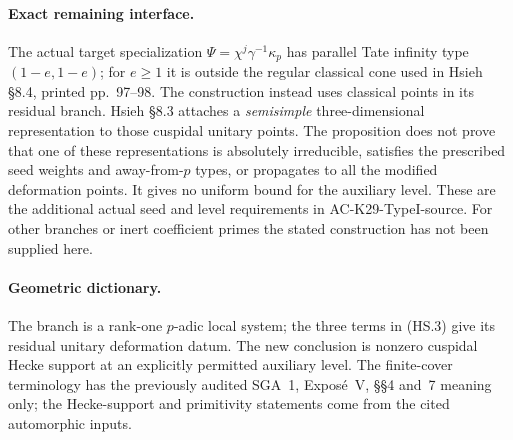 \paragraph{Exact remaining interface.}
The actual target specialization
$\Psi=\chi^j\gamma^{-1}\kappa_p$ has parallel Tate
infinity type $(1-e,1-e)$; for $e\ge1$ it is outside
the regular classical cone used in Hsieh \S8.4,
printed pp.~97--98.  The construction instead uses
classical points in its residual branch.
Hsieh \S8.3 attaches a \emph{semisimple}
three-dimensional representation to those cuspidal
unitary points.  The proposition does not prove
that one of these representations is absolutely
irreducible, satisfies the prescribed seed weights
and away-from-$p$ types, or propagates to all the
modified deformation points.
It gives no uniform bound for the auxiliary level.
These are the additional actual seed and level
requirements in AC-K29-TypeI-source.
For other branches or inert coefficient primes the
stated construction has not been supplied here.

\paragraph{Geometric dictionary.}
The branch is a rank-one $p$-adic local system; the
three terms in (HS.3) give its residual unitary
deformation datum.  The new conclusion is nonzero
cuspidal Hecke support at an explicitly permitted
auxiliary level.  The finite-cover terminology has
the previously audited SGA~1, Expos\'e~V, \S\S4 and~7
meaning only; the Hecke-support and primitivity
statements come from the cited automorphic inputs.

